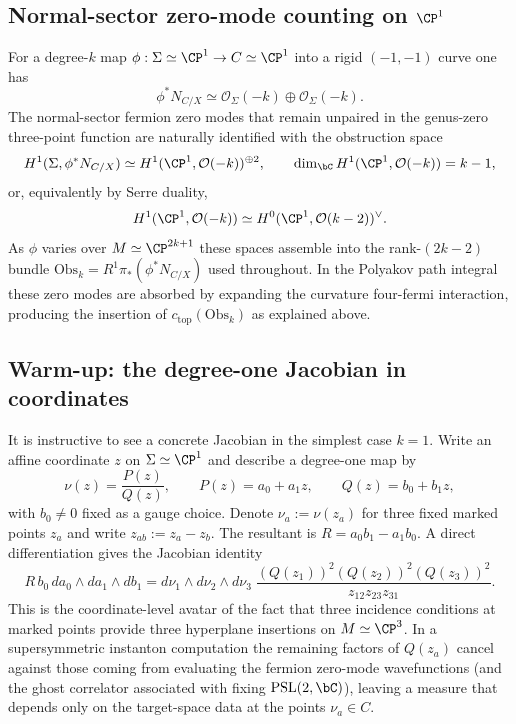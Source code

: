 \documentclass[12pt]{article}
\begin{document}
\subsection{Normal-sector zero-mode counting on \texorpdfstring{$\CP^1$}{CP1}}
For a degree-$k$ map $\phi:\Sigma\simeq\CP^1\to C\simeq\CP^1$ into a rigid
$(-1,-1)$ curve one has
\begin{equation*}
  \phi^*N_{C/X}\simeq \mathcal{O}_\Sigma(-k)\oplus \mathcal{O}_\Sigma(-k).
\end{equation*}
The normal-sector fermion zero modes that remain unpaired in the genus-zero
three-point function are naturally identified with the obstruction space
\begin{equation*}
  H^1(\Sigma,\phi^*N_{C/X})
  \simeq
  H^1(\CP^1,\mathcal{O}(-k))^{\oplus 2},
  \qquad
  \dim_\bC H^1(\CP^1,\mathcal{O}(-k))=k-1,
\end{equation*}
or, equivalently by Serre duality,
\begin{equation*}
  H^1(\CP^1,\mathcal{O}(-k))\simeq H^0(\CP^1,\mathcal{O}(k-2))^\vee.
\end{equation*}
As $\phi$ varies over $M\simeq\CP^{2k+1}$ these spaces assemble into the
rank-$(2k-2)$ bundle $\mathrm{Obs}_k=R^1\pi_*(\phi^*N_{C/X})$ used throughout.
In the Polyakov path integral these zero modes are absorbed by expanding the
curvature four-fermi interaction, producing the insertion of
$c_{\mathrm{top}}(\mathrm{Obs}_k)$ as explained above.

\subsection{Warm-up: the degree-one Jacobian in coordinates}
It is instructive to see a concrete Jacobian in the simplest case $k=1$. Write
an affine coordinate $z$ on $\Sigma\simeq\CP^1$ and describe a degree-one map by
\begin{equation*}
  \nu(z)=\frac{P(z)}{Q(z)},
  \qquad
  P(z)=a_0+a_1 z,\qquad Q(z)=b_0+b_1 z,
\end{equation*}
with $b_0\neq 0$ fixed as a gauge choice. Denote $\nu_a:=\nu(z_a)$ for three
fixed marked points $z_a$ and write $z_{ab}:=z_a-z_b$. The resultant is
$R=a_0b_1-a_1b_0$. A direct differentiation gives the Jacobian identity
\cite[Eq.~(19.202)]{Yin:FoundationsStringTheory}
\begin{equation}
  R\,b_0\, da_0\wedge da_1\wedge db_1
  =
  d\nu_1\wedge d\nu_2\wedge d\nu_3\;
  \frac{(Q(z_1))^2(Q(z_2))^2(Q(z_3))^2}{z_{12}z_{23}z_{31}}.
  \label{eq:jacobian-k1}
\end{equation}
This is the coordinate-level avatar of the fact that three incidence conditions
at marked points provide three hyperplane insertions on $M\simeq\CP^3$. In a
supersymmetric instanton computation the remaining factors of $Q(z_a)$ cancel
against those coming from evaluating the fermion zero-mode wavefunctions (and
the ghost correlator associated with fixing $\mathrm{PSL}(2,\bC)$), leaving a
measure that depends only on the target-space data at the points
$\nu_a\in C$.
\end{document}
